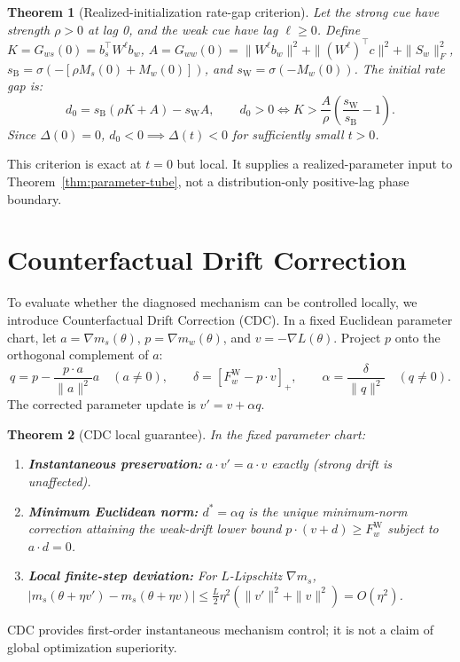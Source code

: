 \documentclass{article}
\newtheorem{theorem}{Theorem}
\theoremstyle{definition}
\theoremstyle{remark}
\newcommand{\sigm}{\sigma}
\newcommand{\Bcond}{\mathrm{B}}
\newcommand{\Wcond}{\mathrm{W}}
\begin{document}
\begin{theorem}[Realized-initialization rate-gap criterion]
\label{thm:initial-gap}
Let the strong cue have strength $\rho > 0$ at lag 0, and the weak cue have lag $\ell \ge 0$. Define $K = G_{ws}(0) = b_s^\top W^\ell b_w$, $A = G_{ww}(0) = \|W^\ell b_w\|^2 + \|(W^\ell)^\top c\|^2 + \|S_w\|_F^2$, $s_{\Bcond} = \sigm(-[\rho M_s(0) + M_w(0)])$, and $s_{\Wcond} = \sigm(-M_w(0))$. The initial rate gap is:
\begin{equation}
  d_0 = s_{\Bcond}(\rho K + A) - s_{\Wcond} A, \qquad d_0 > 0 \iff K > \frac{A}{\rho}\left(\frac{s_{\Wcond}}{s_{\Bcond}} - 1\right).
  \label{eq:initial-gap-formula}
\end{equation}
Since $\Delta(0) = 0$, $d_0 < 0 \implies \Delta(t) < 0$ for sufficiently small $t > 0$.
\end{theorem}
This criterion is exact at $t=0$ but local. It supplies a realized-parameter input to Theorem~\ref{thm:parameter-tube}, not a distribution-only positive-lag phase boundary.

\section{Counterfactual Drift Correction}
\label{sec:cdc}
To evaluate whether the diagnosed mechanism can be controlled locally, we introduce Counterfactual Drift Correction (CDC). In a fixed Euclidean parameter chart, let $a = \nabla m_s(\theta)$, $p = \nabla m_w(\theta)$, and $v = -\nabla L(\theta)$.
Project $p$ onto the orthogonal complement of $a$:
\begin{equation}
  q = p - \frac{p \cdot a}{\|a\|^2} a \quad (a \ne 0), \qquad \delta = [F_w^{\Wcond} - p \cdot v]_+, \qquad \alpha = \frac{\delta}{\|q\|^2} \quad (q \ne 0).
  \label{eq:cdc-formula}
\end{equation}
The corrected parameter update is $v' = v + \alpha q$.

\begin{theorem}[CDC local guarantee]
\label{thm:cdc-guarantee}
In the fixed parameter chart:
\begin{enumerate}[leftmargin=*]
  \item \textbf{Instantaneous preservation:} $a \cdot v' = a \cdot v$ exactly (strong drift is unaffected).
  \item \textbf{Minimum Euclidean norm:} $d^* = \alpha q$ is the unique minimum-norm correction attaining the weak-drift lower bound $p \cdot (v+d) \ge F_w^{\Wcond}$ subject to $a \cdot d = 0$.
  \item \textbf{Local finite-step deviation:} For $L$-Lipschitz $\nabla m_s$, $|m_s(\theta + \eta v') - m_s(\theta + \eta v)| \le \frac{L}{2} \eta^2 (\|v'\|^2 + \|v\|^2) = O(\eta^2)$.
\end{enumerate}
\end{theorem}
CDC provides first-order instantaneous mechanism control; it is not a claim of global optimization superiority.
\end{document}
